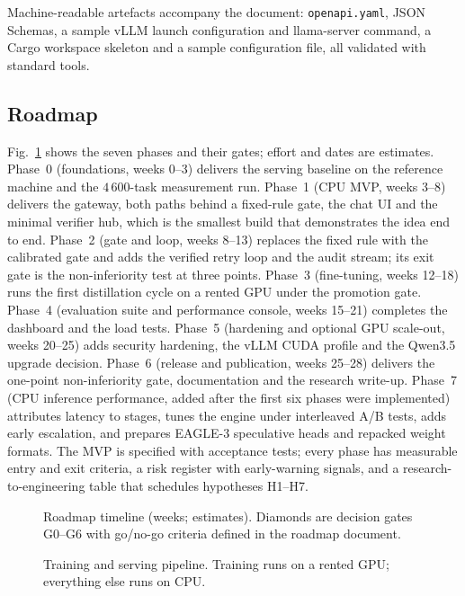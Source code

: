 Machine-readable artefacts accompany the document: \texttt{openapi.yaml},
JSON Schemas, a sample vLLM launch configuration and llama-server command,
a Cargo workspace skeleton and a sample configuration file, all validated
with standard tools.

\subsection{Roadmap}
Fig.~\ref{fig:gantt} shows the seven phases and their gates; effort and dates
are estimates. Phase~0 (foundations, weeks 0--3) delivers the serving
baseline on the reference machine and the $4\,600$-task measurement run.
Phase~1 (CPU MVP, weeks 3--8) delivers the gateway, both paths behind a
fixed-rule gate, the chat UI and the minimal verifier hub, which is the
smallest build that demonstrates the idea end to end. Phase~2 (gate and
loop, weeks 8--13) replaces the fixed rule with the calibrated gate and adds
the verified retry loop and the audit stream; its exit gate is the
non-inferiority test at three points. Phase~3 (fine-tuning, weeks 12--18)
runs the first distillation cycle on a rented GPU under the promotion gate.
Phase~4 (evaluation suite and performance console, weeks 15--21) completes
the dashboard and the load tests. Phase~5 (hardening and optional GPU
scale-out, weeks 20--25) adds security hardening, the vLLM CUDA profile and
the Qwen3.5 upgrade decision. Phase~6 (release and publication, weeks
25--28) delivers the one-point non-inferiority gate, documentation and the
research write-up. Phase~7 (CPU inference performance, added after the
first six phases were implemented) attributes latency to stages, tunes the
engine under interleaved A/B tests, adds early escalation, and prepares
EAGLE-3 speculative heads and repacked weight formats. The MVP is specified with acceptance tests; every phase
has measurable entry and exit criteria, a risk register with early-warning
signals, and a research-to-engineering table that schedules hypotheses
H1--H7.

\begin{figure}[t]
\centering

\caption{Roadmap timeline (weeks; estimates). Diamonds are decision gates
G0--G6 with go/no-go criteria defined in the roadmap document.}
\label{fig:gantt}
\end{figure}

\begin{figure}[t]
\centering

\caption{Training and serving pipeline. Training runs on a rented GPU;
everything else runs on CPU.}
\label{fig:pipeline}
\end{figure}
